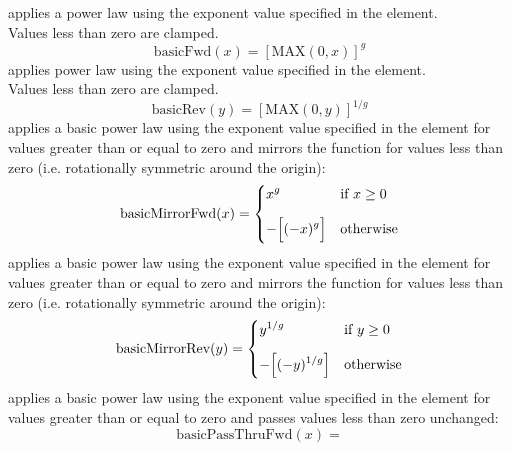 \begin{xmlfields}
		\begin{xmlfields}
			\xmlitemd["basicFwd"] applies a power law using the exponent value specified in the  element. \\
			Values less than zero are clamped.
				\begin{equation} \label{eq:expBasicFwd}
					\text{basicFwd}(x) = [\text{MAX}(0, x)]^{g}
				\end{equation}			
			\xmlitemd["basicRev"] applies power law using the exponent value specified in the  element. \\
			Values less than zero are clamped.
				\begin{equation} \label{eq:expBasicRev}
					\text{basicRev}(y) = [\text{MAX}(0, y)]^{1/g}
				\end{equation}
			\xmlitemd["basicMirrorFwd"] applies a basic power law using the exponent value specified in the  element for values greater than or equal to zero and mirrors the function for values less than zero (i.e. rotationally symmetric around the origin):
				\begin{equation} \label{eq:expbasicMirrorFwd}
					\text{basicMirrorFwd}(x) = 
					    \begin{dcases}
					        x^{g} & \text{if } x \geq 0 \\[6pt]
					        -\Big[(-x)^{g}\Big] & \text{otherwise}
					    \end{dcases}				\end{equation}			
			\xmlitemd["basicMirrorRev"] applies a basic power law using the exponent value specified in the  element for values greater than or equal to zero and mirrors the function for values less than zero (i.e. rotationally symmetric around the origin):
				\begin{equation} \label{eq:expbasicMirrorRev}
					\text{basicMirrorRev}(y) = 
					    \begin{dcases}
					        y^{1/g} & \text{if } y \geq 0 \\[6pt]
					        -\Big[(-y)^{1/g}\Big] & \text{otherwise}
					    \end{dcases}
				\end{equation}
			\xmlitemd["basicPassThruFwd"] applies a basic power law using the exponent value specified in the  element for values greater than or equal to zero and passes values less than zero unchanged:
				\begin{equation} \label{eq:expbasicPassThruFwd}
					\text{basicPassThruFwd}(x) = 

\end{equation}
\end{xmlfields}
\end{xmlfields}
